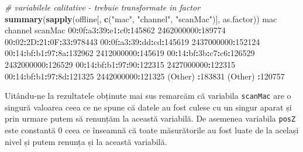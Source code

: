 \documentclass[]{article}
\newenvironment{Shaded}{\begin{snugshade}}{\end{snugshade}}
\newcommand{\KeywordTok}[1]{\textcolor[rgb]{0.13,0.29,0.53}{\textbf{#1}}}
\newcommand{\DecValTok}[1]{\textcolor[rgb]{0.00,0.00,0.81}{#1}}
\newcommand{\StringTok}[1]{\textcolor[rgb]{0.31,0.60,0.02}{#1}}
\newcommand{\CommentTok}[1]{\textcolor[rgb]{0.56,0.35,0.01}{\textit{#1}}}
\newcommand{\OperatorTok}[1]{\textcolor[rgb]{0.81,0.36,0.00}{\textbf{#1}}}
\newcommand{\NormalTok}[1]{#1}
\begin{document}
\begin{Shaded}
\begin{Highlighting}[]
\CommentTok{# variabilele calitative - trebuie transformate in factor}
\KeywordTok{summary}\NormalTok{(}\KeywordTok{sapply}\NormalTok{(offline[, }\KeywordTok{c}\NormalTok{(}\StringTok{"mac"}\NormalTok{, }\StringTok{"channel"}\NormalTok{, }\StringTok{"scanMac"}\NormalTok{)], }
\NormalTok{               as.factor))}
\NormalTok{                mac               channel                    scanMac      }
 \DecValTok{00}\OperatorTok{:}\NormalTok{0f}\OperatorTok{:}\NormalTok{a3}\OperatorTok{:}\DecValTok{39}\OperatorTok{:}\NormalTok{e1}\OperatorTok{:}\NormalTok{c0}\OperatorTok{:}\DecValTok{145862}   \DecValTok{2462000000}\OperatorTok{:}\DecValTok{189774}   \DecValTok{00}\OperatorTok{:}\DecValTok{02}\OperatorTok{:}\NormalTok{2D}\OperatorTok{:}\DecValTok{21}\OperatorTok{:}\NormalTok{0F}\OperatorTok{:}\DecValTok{33}\OperatorTok{:}\DecValTok{978443}  
 \DecValTok{00}\OperatorTok{:}\NormalTok{0f}\OperatorTok{:}\NormalTok{a3}\OperatorTok{:}\DecValTok{39}\OperatorTok{:}\NormalTok{dd}\OperatorTok{:}\NormalTok{cd}\OperatorTok{:}\DecValTok{145619}   \DecValTok{2437000000}\OperatorTok{:}\DecValTok{152124}                             
 \DecValTok{00}\OperatorTok{:}\DecValTok{14}\OperatorTok{:}\NormalTok{bf}\OperatorTok{:}\NormalTok{b1}\OperatorTok{:}\DecValTok{97}\OperatorTok{:}\NormalTok{8a}\OperatorTok{:}\DecValTok{132962}   \DecValTok{2412000000}\OperatorTok{:}\DecValTok{145619}                             
 \DecValTok{00}\OperatorTok{:}\DecValTok{14}\OperatorTok{:}\NormalTok{bf}\OperatorTok{:}\NormalTok{3b}\OperatorTok{:}\NormalTok{c7}\OperatorTok{:}\NormalTok{c6}\OperatorTok{:}\DecValTok{126529}   \DecValTok{2432000000}\OperatorTok{:}\DecValTok{126529}                             
 \DecValTok{00}\OperatorTok{:}\DecValTok{14}\OperatorTok{:}\NormalTok{bf}\OperatorTok{:}\NormalTok{b1}\OperatorTok{:}\DecValTok{97}\OperatorTok{:}\DecValTok{90}\OperatorTok{:}\DecValTok{122315}   \DecValTok{2427000000}\OperatorTok{:}\DecValTok{122315}                             
 \DecValTok{00}\OperatorTok{:}\DecValTok{14}\OperatorTok{:}\NormalTok{bf}\OperatorTok{:}\NormalTok{b1}\OperatorTok{:}\DecValTok{97}\OperatorTok{:}\NormalTok{8d}\OperatorTok{:}\DecValTok{121325}   \DecValTok{2442000000}\OperatorTok{:}\DecValTok{121325}                             
\NormalTok{ (Other)          }\OperatorTok{:}\DecValTok{183831}\NormalTok{   (Other)   }\OperatorTok{:}\DecValTok{120757}                             
\end{Highlighting}
\end{Shaded}

Uitându-ne la rezultatele obținute mai sus remarcăm că variabila
\texttt{scanMac} are o singură valoarea ceea ce ne spune că datele au
fost culese cu un singur aparat și prin urmare putem să renunțăm la
această variabilă. De asemenea variabila \texttt{posZ} este constantă
\(0\) ceea ce înseamnă că toate măsurătorile au fost luate de la același
nivel și putem renunța și la această variabilă.
\end{document}
